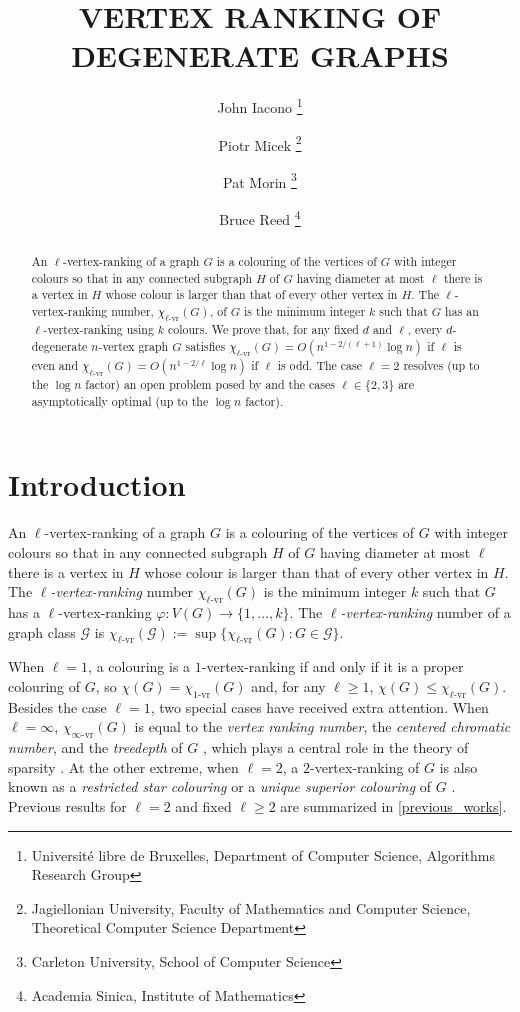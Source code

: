 \documentclass{patmorin}
\title{\MakeUppercase{Vertex Ranking of Degenerate Graphs}}
\author{%
  John Iacono%
    \thanks{Université libre de Bruxelles,
      Department of Computer Science, Algorithms Research Group} \and
  Piotr Micek%
    \thanks{Jagiellonian University,
      Faculty of Mathematics and Computer Science,
      Theoretical Computer Science Department} \and
  Pat Morin%
    \thanks{Carleton University, School of Computer Science}\and
  Bruce Reed%
    \thanks{Academia Sinica, Institute of Mathematics}}
\newcommand{\defin}[1]{\emph{\color{brightmaroon}#1}}
\newcommand{\rn}[1]{\chi_{\operatorname{#1-vr}}}
\newcommand{\lrn}{\rn{\ell}}
\begin{document}
\maketitle

\begin{abstract}
  An $\ell$-vertex-ranking of a graph $G$ is a colouring of the vertices of $G$ with integer colours so that in any connected subgraph $H$ of $G$ having diameter at most $\ell$ there is a vertex in $H$ whose colour is larger than that of every other vertex in $H$.  The $\ell$-vertex-ranking number, $\lrn(G)$, of $G$ is the minimum integer $k$ such that $G$ has an $\ell$-vertex-ranking using $k$ colours.  We prove that, for any fixed $d$ and $\ell$, every $d$-degenerate $n$-vertex graph $G$ satisfies $\lrn(G)= O(n^{1-2/(\ell+1)}\log n)$ if $\ell$ is even and $\lrn(G)= O(n^{1-2/\ell}\log n)$ if $\ell$ is odd. The case $\ell=2$ resolves (up to the $\log n$ factor) an open problem posed by \citet{karpas.neiman.ea:on} and the cases $\ell\in\{2,3\}$ are asymptotically optimal (up to the $\log n$ factor).
\end{abstract}


\section{Introduction}

An $\ell$-vertex-ranking of a graph $G$ is a colouring of the vertices of $G$ with integer colours so that in any connected subgraph $H$ of $G$ having diameter at most $\ell$ there is a vertex in $H$ whose colour is larger than that of every other vertex in $H$.  The \defin{$\ell$-vertex-ranking} number $\lrn(G)$ is the minimum integer $k$ such that $G$ has a $\ell$-vertex-ranking $\varphi:V(G)\to\{1,\ldots,k\}$. The \defin{$\ell$-vertex-ranking} number of a graph class $\mathcal{G}$ is $\lrn(\mathcal{G}):=\sup\{\lrn(G):G\in\mathcal{G}\}$.



When $\ell=1$, a colouring is a $1$-vertex-ranking if and only if it is a proper colouring of $G$, so $\chi(G)=\rn{1}(G)$ and, for any $\ell\ge 1$, $\chi(G)\le \lrn(G)$.  Besides the case $\ell=1$, two special cases have received extra attention.  When $\ell=\infty$, $\rn{\infty}(G)$ is equal to the \defin{vertex ranking number}, the \defin{centered chromatic number}, and the \defin{treedepth} of $G$
\cite{nesetril.ossona:tree-depth},
which plays a central role in the theory of sparsity  \cite{nesetril.ossona:sparsity}.
At the other extreme, when $\ell=2$, a $2$-vertex-ranking of $G$ is also known as a \defin{restricted star colouring} \cite{shalu.antony:complexity} or a \defin{unique superior colouring} of $G$ \cite{karpas.neiman.ea:on}.  Previous results for $\ell=2$ and fixed $\ell\ge 2$ are summarized in \cref{previous_works}.
\end{document}
